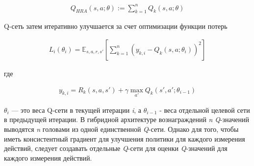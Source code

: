 \begin{equation}
    \begin{multlined}
        Q_{H R A}(s, a; \theta) := \sum^n_{k=1} Q_k(s, a;\theta)
    \end{multlined}
\end{equation}

Q-сеть затем итеративно улучшается за счет оптимизации функции потерь

\begin{equation}
    \begin{multlined}
        L_i(\theta_i) = \mathbb{E}_{s, a, r, s'}[\sum^n_{k=1}(y_{k, i}-Q_k(s, a;\theta_i))^2]
    \end{multlined}
\end{equation}

где

\begin{equation}
    \begin{multlined}
        y_{k, i} = R_k(s, a, s') + \gamma \max_{a'} Q_k(s', a';\theta_{i-1})
    \end{multlined}
\end{equation}

$\theta_i$ — это веса Q-сети в текущей итерации \textit{i}, а $\theta_{i-1}$ - веса отдельной целевой сети в предыдущей итерации.
В гибридной архитектуре вознаграждений \textit{n} \textit{Q}-значений выводятся \textit{n} головами из одной единственной \textit{Q}-сети. Однако для того, чтобы иметь консистентный градиент для улучшения политики для каждого измерения действий, следует создавать отдельные \textit{Q}-сети для оценки \textit{Q}-значений для каждого измерения действий.
